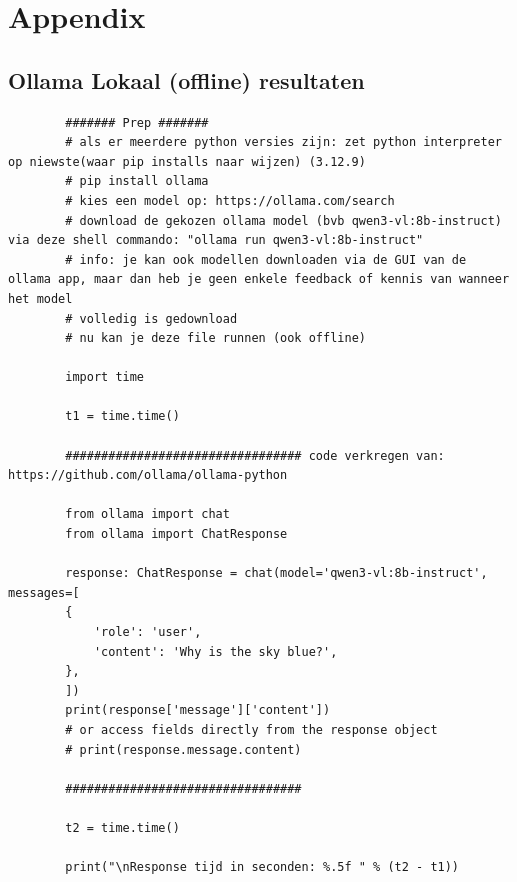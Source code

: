 \chapter{Appendix}
\label{ch:appendix}



\section{Ollama Lokaal (offline) resultaten}
\label{sec:ollamalokaalofflineresultaten}

\begin{listing}
    \begin{verbatim}
        ####### Prep #######
        # als er meerdere python versies zijn: zet python interpreter op niewste(waar pip installs naar wijzen) (3.12.9)
        # pip install ollama
        # kies een model op: https://ollama.com/search
        # download de gekozen ollama model (bvb qwen3-vl:8b-instruct) via deze shell commando: "ollama run qwen3-vl:8b-instruct"
        # info: je kan ook modellen downloaden via de GUI van de ollama app, maar dan heb je geen enkele feedback of kennis van wanneer het model
        # volledig is gedownload
        # nu kan je deze file runnen (ook offline)
        
        import time
        
        t1 = time.time()
        
        ################################# code verkregen van: https://github.com/ollama/ollama-python
        
        from ollama import chat
        from ollama import ChatResponse
        
        response: ChatResponse = chat(model='qwen3-vl:8b-instruct', messages=[
        {
            'role': 'user',
            'content': 'Why is the sky blue?',
        },
        ])
        print(response['message']['content'])
        # or access fields directly from the response object
        # print(response.message.content)
        
        #################################
        
        t2 = time.time()
        
        print("\nResponse tijd in seconden: %.5f " % (t2 - t1))
    \end{verbatim}
    \caption[Ollama Lokaal Code]{Code om te communiceren met \textit{qwen3-vl:8b-instruct}.}
    \label{lst:ollama-lokaal-test}
\end{listing}

